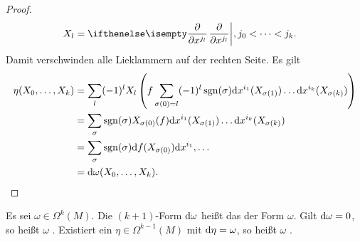 \begin{proof}
\begin{align*}
& X_l = \pdifffrac{}{x^{j_l}}, j_0 < \cdots < j_k.
\end{align*}
Damit verschwinden alle Lieklammern auf der rechten Seite.
Es gilt 
\begin{align*}
  \eta(X_0, \ldots, X_k) & = \sum_l(-1)^lX_l\left(f\sum_{\sigma(0) = l} (-1)^l \operatorname{sgn}(\sigma) \mathrm{d} x^{i_1}(X_{\sigma(1)}) \ldots \mathrm{d} x^{i_k}(X_{\sigma(k)})\right)\\
  & = \sum_{\sigma} \operatorname{sgn}(\sigma) X_{\sigma(0)}(f) \mathrm{d} x^{i_1} (X_{\sigma(1)}) \ldots \mathrm{d} x^{i_k}(X_{\sigma(k)})\\
  & =\sum_{\sigma} \operatorname{sgn}(\sigma) \mathrm{d} f(X_{\sigma(0)})\mathrm{d} x^{i_1}, \ldots\\
  & = \mathrm{d} \omega(X_0, \ldots, X_k).
\end{align*}
\end{proof}

\begin{Dfn}
  Es sei $\omega \in \Omega^k(M)$. Die $(k+1)$-Form $\mathrm{d} \omega$ heißt das  der Form $\omega$.
  Gilt $\mathrm{d} \omega = 0$, so heißt $\omega$ .
  Existiert ein $\eta \in \Omega^{k-1}(M)$ mit $\mathrm{d} \eta = \omega$, so heißt $\omega$ .
\end{Dfn}

